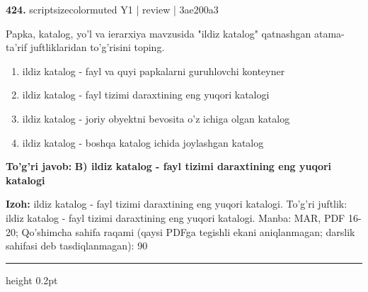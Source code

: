 \documentclass[10pt,a4paper]{article}
\begin{document}
{\bfseries\sffamily\color{ink} 424.} {scriptsizecolor{muted} Y1 | review | 3ae200a3}
\par
Papka, katalog, yo'l va ierarxiya mavzusida "ildiz katalog" qatnashgan atama-ta'rif juftliklaridan to'g'risini toping.
\begin{enumerate}[label=\Alph*),leftmargin=9mm]
\item ildiz katalog - fayl va quyi papkalarni guruhlovchi konteyner
\item ildiz katalog - fayl tizimi daraxtining eng yuqori katalogi
\item ildiz katalog - joriy obyektni bevosita o'z ichiga olgan katalog
\item ildiz katalog - boshqa katalog ichida joylashgan katalog
\end{enumerate}
\begin{tcolorbox}[enhanced,breakable,colback=teal!4,colframe=teal!60!black,boxrule=0.45pt,arc=1.2mm,left=2.7mm,right=2.7mm,top=1.8mm,bottom=1.8mm,before skip=2mm,after skip=2mm]
{\bfseries\sffamily\color{teal}To'g'ri javob:} \textbf{B) ildiz katalog - fayl tizimi daraxtining eng yuqori katalogi}
\par\smallskip
{\bfseries Izoh:} ildiz katalog - fayl tizimi daraxtining eng yuqori katalogi. To'g'ri juftlik: ildiz katalog - fayl tizimi daraxtining eng yuqori katalogi. Manba: MAR, PDF 16-20; Qo'shimcha sahifa raqami (qaysi PDFga tegishli ekani aniqlanmagan; darslik sahifasi deb tasdiqlanmagan): 90
\end{tcolorbox}
\vspace{2mm}\hrule height 0.2pt\vspace{3mm}
\end{document}
